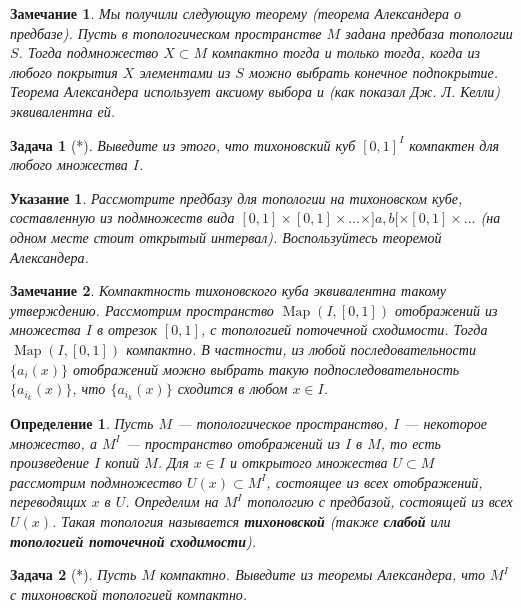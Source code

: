 \documentclass[12pt]{book}
\def\Map{\operatorname{Map}}
\theoremstyle{upshape}
\newtheorem{zadacha}{Задача}[chapter]
\theoremstyle{generic}
\newtheorem{opredelenie}[teorema]{Определение}
\theoremstyle{upshapenonumber}
\newtheorem{ukazanie}{Указание}[section]
\newtheorem{zamechanie}{Замечание}[chapter]
\newcommand{\следствие}{%
     \refstepcounter{teorema}
     {\noindent\bf Следствие \thechapter.\arabic{teorema}:\ }}
\newcommand{\пример}{%
     \refstepcounter{teorema}
     {\noindent\bf Пример \thechapter.\arabic{teorema}:\ }}
\newcommand{\лемма}{%
     \refstepcounter{teorema}
     {\noindent\bf Лемма \thechapter.\arabic{teorema}:\ }}
\newcommand{\теорема}{%
     \refstepcounter{teorema}
     {\noindent\bf Теорема \thechapter.\arabic{teorema}:\ }}
\newcommand{\утверждение}{%
     \refstepcounter{teorema}
     {\noindent\bf Утверждение \thechapter.\arabic{teorema}:\ }}
\begin{document}
{\begin{zamechanie}
Мы получили следующую теорему
(теорема Александера о предбазе).
Пусть в топологическом пространстве $M$ задана
предбаза топологии $S$. Тогда подмножество
$X\subset M$ компактно тогда и только тогда,
когда из любого покрытия $X$ элементами из
$S$ можно выбрать конечное подпокрытие.
Теорема Александера использует аксиому выбора
и (как показал Дж. Л. Келли) эквивалентна ей.
\end{zamechanie}

\begin{zadacha}[*]
Выведите из этого, что
тихоновский куб $[0,1]^I$
компактен для любого множества $I$.
\end{zadacha}

\begin{ukazanie}
Рассмотрите предбазу для топологии на 
тихоновском кубе, составленную из 
подмножеств вида 
$[0,1]\times [0,1]\times \dots \times ]a,b[ \times [0,1]\times \dots$
(на одном месте стоит открытый интервал).
Воспользуйтесь теоремой Александера.
\end{ukazanie}

\begin{zamechanie} 
Компактность тихоновского куба эквивалентна такому
утверждению. Рассмотрим пространство $\Map(I, [0,1])$  отображений
из множества $I$ в отрезок $[0,1]$, с топологией
поточечной сходимости. Тогда  $\Map(I, [0,1])$ компактно.
В частности, из любой последовательности $\{a_{i}(x)\}$
отображений можно выбрать такую подпоследовательность $\{a_{i_k}(x)\}$, 
что $\{a_{i_k}(x)\}$ сходится в любом $x\in I$.
\end{zamechanie}

\begin{opredelenie}
Пусть $M$ --- топологическое пространство,
$I$ --- некоторое множество, а $M^I$ --- пространство
отображений из $I$ в $M$, то есть произведение $I$ копий
$M$. Для $x\in I$ и открытого множества
$U\subset M$ рассмотрим подмножество
$U(x)\subset M^I$, состоящее из всех
отображений, переводящих $x$ в $U$.  
Определим на $M^I$ топологию с предбазой,
состоящей из всех $U(x)$. Такая топология
называется {\bf тихоновской} (также {\bf слабой}
или {\bf топологией поточечной сходимости}).
\end{opredelenie}

\begin{zadacha}[*]
Пусть $M$ компактно. Выведите из
теоремы Александера, что $M^I$ с 
тихоновской топологией компактно.
\end{zadacha}


}
\end{document}

